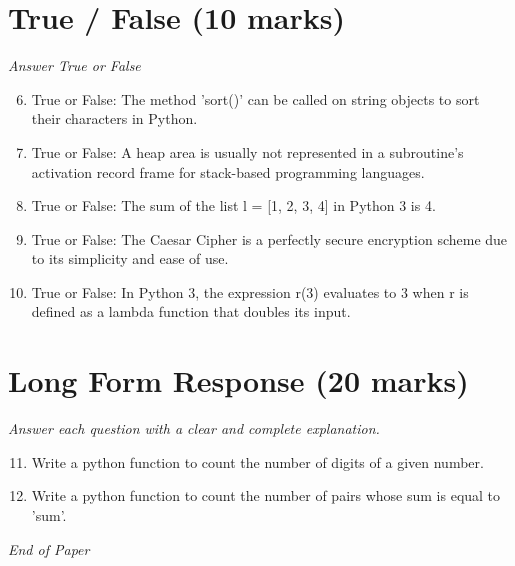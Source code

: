\documentclass[12pt]{article}
\begin{document}
\section*{True / False (10 marks)}
\textit{Answer True or False}
\begin{enumerate}[label=\arabic*.]
\setcounter{enumi}{5}
\item True or False: The method 'sort()' can be called on string objects to sort their characters in Python.
\item True or False: A heap area is usually not represented in a subroutine's activation record frame for stack-based programming languages.
\item True or False: The sum of the list l = [1, 2, 3, 4] in Python 3 is 4.
\item True or False: The Caesar Cipher is a perfectly secure encryption scheme due to its simplicity and ease of use.
\item True or False: In Python 3, the expression r(3) evaluates to 3 when r is defined as a lambda function that doubles its input.
\end{enumerate}

\section*{Long Form Response (20 marks)}
\textit{Answer each question with a clear and complete explanation.}
\begin{enumerate}[label=\arabic*.]
\setcounter{enumi}{10}
\item Write a python function to count the number of digits of a given number.
\item Write a python function to count the number of pairs whose sum is equal to 'sum'.
\end{enumerate}

\vfill
\noindent\textit{End of Paper}
\end{document}
